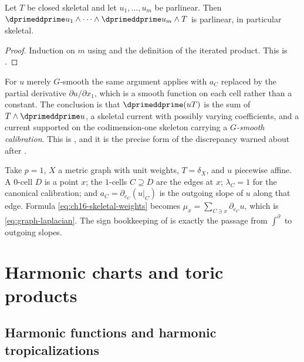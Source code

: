 \begin{corollary}
\label{cor:ch16-skeletal-iterated}
Let $T$ be closed skeletal and let $u_1,\ldots,u_m$ be parlinear.  Then
$\dprimeddprime u_1\wedge\cdots\wedge\dprimeddprime u_m\wedge T$ is
parlinear, in particular skeletal.
\end{corollary}

\begin{proof}
Induction on $m$ using  and the definition
of the iterated product.  This is \cite[Corollary~8.10.5]{CLD25}.
\end{proof}

\begin{remark}
\label{rem:ch16-skeletal-gsmooth}
For $u$ merely $G$-smooth the same argument applies with $a_C$ replaced by
the partial derivative $\partial u/\partial x_1$, which is a smooth function
on each cell rather than a constant.  The conclusion is that
$\dprimeddprime(uT)$ is the sum of $T\wedge\dprimeddprime u$, a skeletal
current with possibly varying coefficients, and a current supported on the
codimension-one skeleton
carrying a \emph{$G$-smooth calibration}.  This is
\cite[Remark~8.10.4]{CLD25}, and it is the precise form of the discrepancy
warned about after .
\end{remark}

\begin{example}
\label{ex:ch16-skeletal-weights-graph}
Take $p=1$, $X$ a metric graph with unit weights, $T=\delta_X$, and $u$
piecewise affine.  A $0$-cell $D$ is a point $x$; the $1$-cells $C\supseteq
D$ are the edges at $x$; $\lambda_C=1$ for the canonical calibration; and
$a_C=\partial_{e_C}(u|_C)$ is the outgoing slope of $u$ along that edge.
Formula \eqref{eq:ch16-skeletal-weights} becomes
$\mu_x=\sum_{C\ni x}\partial_{e_C}u$, which is
\eqref{eq:graph-laplacian}.  The sign bookkeeping of
 is exactly the passage from
$\int^\partial$ to outgoing slopes.
\end{example}

\section{Harmonic charts and toric products}
\label{sec:ch16-harmonic-charts}

\subsection{Harmonic functions and harmonic tropicalizations}
\label{sec:ch16-harmonic-definitions}

